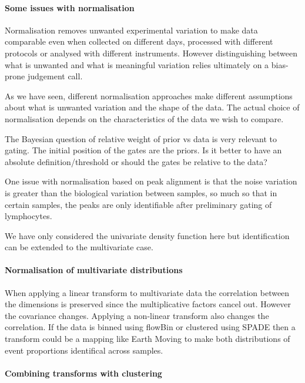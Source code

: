 \paragraph{Some issues with normalisation}

Normalisation removes unwanted experimental variation to make data comparable even when collected on different days,
processed with different protocols or analysed with different instruments.
However distinguishing between what is unwanted and what is meaningful variation relies ultimately on a bias-prone judgement call.

As we have seen, different normalisation approaches make different assumptions about what is unwanted variation and the shape of the data.
The actual choice of normalisation depends on the characteristics of the data we wish to compare.

The Bayesian question of relative weight of prior vs data is very relevant to gating.
The initial position of the gates are the priors.
Is it better to have an absolute definition/threshold or should the gates be relative to the data?
 
One issue with normalisation based on peak alignment is that the noise variation is greater than the biological variation between samples, so much so that in certain samples, the peaks are only identifiable after preliminary gating of lymphocytes.

We have only considered the univariate density function here but identification can be extended to the multivariate case.

\paragraph{Normalisation of multivariate distributions}

When applying a linear transform to multivariate data the correlation between the dimensions is preserved since the multiplicative factors cancel out.
However the covariance changes.
Applying a non-linear transform also changes the correlation.
If the data is binned using flowBin or clustered using SPADE then a transform could be a mapping like Earth Moving to make both distributions of event proportions identifical across samples.

\paragraph{Combining transforms with clustering}

